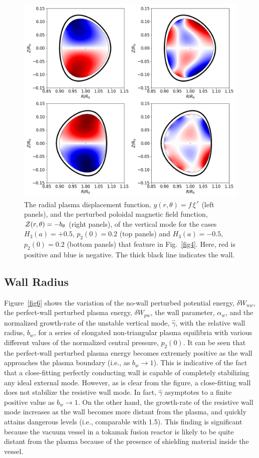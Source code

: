 \documentclass[12pt,prb,aps]{revtex4-1}
\begin{document}
\begin{figure}
\centerline{\includegraphics[width=\textwidth]{Fig5.png}}
\caption{The radial plasma displacement function, $y(r,\theta)=f\,\xi^{\,r}$ (left panels),  and the perturbed poloidal magnetic
field function, ${\cal Z}(r,\theta)= - b_\theta$ (right panels), of the vertical mode for the cases $H_3(a)=+0.5$, $p_2(0)=0.2$ (top panels) and $H_3(a)=-0.5$, $p_2(0)=0.2$  (bottom panels) that feature in Fig.~\ref{fig4}.
Here, red is positive and blue is negative. The thick black line indicates the wall. \label{fig5}}
\end{figure}

\subsection{Wall Radius}
Figure~\ref{fig6} shows the variation of the no-wall perturbed potential energy, $\delta W_{nw}$, the perfect-wall perturbed plasma energy, $\delta W_{pw}$, the wall 
parameter, $\alpha_w$, and the normalized growth-rate of the unstable vertical mode, $\hat{\gamma}$, with the relative wall radius, $b_w$,   for a series of
elongated non-triangular plasma equilibria with various different values of the normalized central pressure, $p_2(0)$. It can be seen that
the perfect-wall perturbed plasma energy becomes extremely positive as the wall approaches the plasma boundary (i.e., as $b_w\rightarrow 1$). This is
indicative of the fact that a close-fitting perfectly conducting wall is capable of completely stabilizing any ideal external mode.\cite{gs1} 
However, as is clear from the figure, a close-fitting wall does not stabilize the resistive wall mode. In fact, $\hat{\gamma}$ asymptotes to a finite positive
value as $b_w\rightarrow 1$. On the other hand, the growth-rate of the resistive wall  mode increases as the wall becomes more distant from the plasma,
and quickly attains dangerous levels (i.e., comparable with 1.5). This finding is significant because the vacuum vessel in a tokamak fusion reactor is
likely to be quite distant from the plasma because of the presence of shielding material inside the vessel. 
\end{document}
